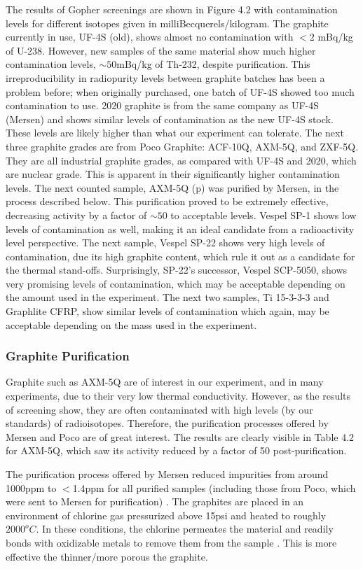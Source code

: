 \documentclass{report}
\begin{document}
The results of Gopher screenings are shown in Figure 4.2 with contamination levels for different isotopes given in milliBecquerels/kilogram. The graphite currently in use, UF-4S (old), shows almost no contamination with $<2$ mBq/kg of U-238. However, new samples of the same material show much higher contamination levels, $\sim 50$mBq/kg of Th-232, despite purification. This irreproducibility in radiopurity levels between graphite batches has been a problem before; when originally purchased, one batch of UF-4S showed too much contamination to use. 2020 graphite is from the same company as UF-4S (Mersen) and shows similar levels of contamination as the new UF-4S stock. These levels are likely higher than what our experiment can tolerate. The next three graphite grades are from Poco Graphite: ACF-10Q, AXM-5Q, and ZXF-5Q. They are all industrial graphite grades, as compared with UF-4S and 2020, which are nuclear grade. This is apparent in their significantly higher contamination levels. The next counted sample, AXM-5Q (p) was purified by Mersen, in the process described below. This purification proved to be extremely effective, decreasing activity by a factor of $\sim50$ to acceptable levels. Vespel SP-1 shows low levels of contamination as well, making it an ideal candidate from a radioactivity level perspective. The next sample, Vespel SP-22 shows very high levels of contamination, due its high graphite content, which rule it out as a candidate for the thermal stand-offs. Surprisingly, SP-22's successor, Vespel SCP-5050, shows very promising levels of contamination, which may be acceptable depending on the amount used in the experiment. The next two samples, Ti 15-3-3-3 and Graphlite CFRP, show similar levels of contamination which again, may be acceptable depending on the mass used in the experiment.

\subsubsection{Graphite Purification}
Graphite such as AXM-5Q are of interest in our experiment, and in many experiments, due to their very low thermal conductivity. However, as the results of screening show, they are often contaminated with high levels (by our standards) of radioisotopes. Therefore, the purification processes offered by Mersen and Poco are of great interest. The results are clearly visible in Table 4.2 for AXM-5Q, which saw its activity reduced by a factor of 50 post-purification.

The purification process offered by Mersen reduced impurities from around 1000ppm to $<$1.4ppm for all purified samples (including those from Poco, which were sent to Mersen for purification) \cite{Mersen_conv}. The graphites are placed in an environment of chlorine gas pressurized above 15psi and heated to roughly $2000^{o}C$. In these conditions, the chlorine permeates the material and readily bonds with oxidizable metals to remove them from the sample \cite{Olivier_conv}. This is more effective the thinner/more porous the graphite.
\end{document}
